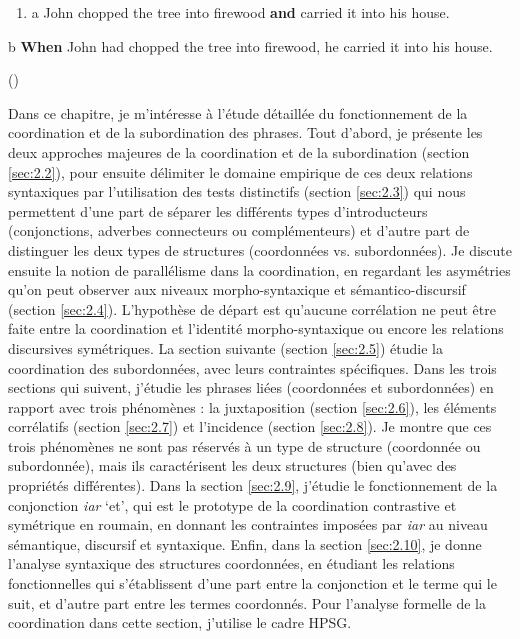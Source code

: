 \begin{enumerate}
\item \label{bkm:Ref271467474}a  John chopped the tree into firewood \textbf{and} carried it into his house.


\end{enumerate}
  b  \textbf{When} John had chopped the tree into firewood, he carried it into his house.

{\raggedleft
            (\citet[376]{Longacre2007})
}

Dans ce chapitre, je m'intéresse à l'étude détaillée du fonctionnement de la coordination et de la subordination des phrases. Tout d'abord, je présente les deux approches majeures de la coordination et de la subordination (section \ref{sec:2.2}), pour ensuite délimiter le domaine empirique de ces deux relations syntaxiques par l'utilisation des tests distinctifs (section \ref{sec:2.3}) qui nous permettent d'une part de séparer les différents types d'introducteurs (conjonctions, adverbes connecteurs ou complémenteurs) et d'autre part de distinguer les deux types de structures (coordonnées vs. subordonnées). Je discute ensuite la notion de parallélisme dans la coordination, en regardant les asymétries qu'on peut observer aux niveaux morpho-syntaxique et sémantico-discursif (section \ref{sec:2.4}). L'hypothèse de départ est qu'aucune corrélation ne peut être faite entre la coordination et l'identité morpho-syntaxique ou encore les relations discursives symétriques. La section suivante (section \ref{sec:2.5}) étudie la coordination des subordonnées, avec leurs contraintes spécifiques. Dans les trois sections qui suivent, j'étudie les phrases liées (coordonnées et subordonnées) en rapport avec trois phénomènes : la juxtaposition (section \ref{sec:2.6}), les éléments corrélatifs (section \ref{sec:2.7}) et l'incidence (section \ref{sec:2.8}). Je montre que ces trois phénomènes ne sont pas réservés à un type de structure (coordonnée ou subordonnée), mais ils caractérisent les deux structures (bien qu'avec des propriétés différentes). Dans la section \ref{sec:2.9}, j'étudie le fonctionnement de la conjonction \textit{iar} `et', qui est le prototype de la coordination contrastive et symétrique en roumain, en donnant les contraintes imposées par \textit{iar} au niveau sémantique, discursif et syntaxique. Enfin, dans la section \ref{sec:2.10}, je donne l'analyse syntaxique des structures coordonnées, en étudiant les relations fonctionnelles qui s'établissent d'une part entre la conjonction et le terme qui le suit, et d'autre part entre les termes coordonnés. Pour l'analyse formelle de la coordination dans cette section, j'utilise le cadre HPSG. 

